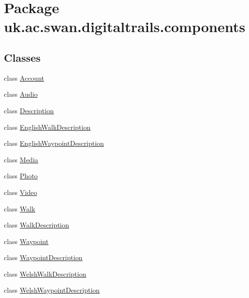 \hypertarget{namespaceuk_1_1ac_1_1swan_1_1digitaltrails_1_1components}{\section{Package uk.\+ac.\+swan.\+digitaltrails.\+components}
\label{namespaceuk_1_1ac_1_1swan_1_1digitaltrails_1_1components}
}
\subsection*{Classes}
\begin{DoxyCompactItemize}
\item 
class \hyperlink{classuk_1_1ac_1_1swan_1_1digitaltrails_1_1components_1_1_account}{Account}
\item 
class \hyperlink{classuk_1_1ac_1_1swan_1_1digitaltrails_1_1components_1_1_audio}{Audio}
\item 
class \hyperlink{classuk_1_1ac_1_1swan_1_1digitaltrails_1_1components_1_1_description}{Description}
\item 
class \hyperlink{classuk_1_1ac_1_1swan_1_1digitaltrails_1_1components_1_1_english_walk_description}{English\+Walk\+Description}
\item 
class \hyperlink{classuk_1_1ac_1_1swan_1_1digitaltrails_1_1components_1_1_english_waypoint_description}{English\+Waypoint\+Description}
\item 
class \hyperlink{classuk_1_1ac_1_1swan_1_1digitaltrails_1_1components_1_1_media}{Media}
\item 
class \hyperlink{classuk_1_1ac_1_1swan_1_1digitaltrails_1_1components_1_1_photo}{Photo}
\item 
class \hyperlink{classuk_1_1ac_1_1swan_1_1digitaltrails_1_1components_1_1_video}{Video}
\item 
class \hyperlink{classuk_1_1ac_1_1swan_1_1digitaltrails_1_1components_1_1_walk}{Walk}
\item 
class \hyperlink{classuk_1_1ac_1_1swan_1_1digitaltrails_1_1components_1_1_walk_description}{Walk\+Description}
\item 
class \hyperlink{classuk_1_1ac_1_1swan_1_1digitaltrails_1_1components_1_1_waypoint}{Waypoint}
\item 
class \hyperlink{classuk_1_1ac_1_1swan_1_1digitaltrails_1_1components_1_1_waypoint_description}{Waypoint\+Description}
\item 
class \hyperlink{classuk_1_1ac_1_1swan_1_1digitaltrails_1_1components_1_1_welsh_walk_description}{Welsh\+Walk\+Description}
\item 
class \hyperlink{classuk_1_1ac_1_1swan_1_1digitaltrails_1_1components_1_1_welsh_waypoint_description}{Welsh\+Waypoint\+Description}
\end{DoxyCompactItemize}


